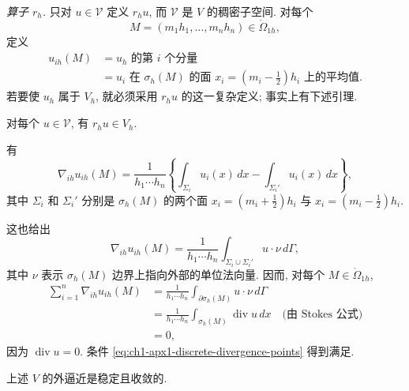 \emph{算子 $r_h$.} 只对 $u\in\mathcal V$ 定义 $r_hu$, 而 $\mathcal V$ 是 $V$ 的稠密子空间. 对每个
\[
M=(m_1h_1,\ldots,m_nh_n)\in\mathring\Omega_{1h},
\]
定义
\begin{equation}
\begin{aligned}
u_{ih}(M)&=u_h\text{ 的第 }i\text{ 个分量}\\
&=u_i\text{ 在 }\sigma_h(M)\text{ 的面 }
x_i=(m_i-\tfrac12)h_i\text{ 上的平均值}.
\end{aligned}
\label{eq:ch1-apx1-restriction-face-average}
\end{equation}
若要使 $u_h$ 属于 $V_h$, 就必须采用 $r_hu$ 的这一复杂定义; 事实上有下述引理.

\begin{Lemma}
\label{lem:ch1-apx1-restriction-in-vh}
对每个 $u\in\mathcal V$, 有 $r_hu\in V_h$.
\end{Lemma}

\begin{Proof}
有
\[
\nabla_{ih}u_{ih}(M)
=\frac1{h_1\cdots h_n}
\left\{\int_{\Sigma_i}u_i(x)\,dx-\int_{\Sigma_i'}u_i(x)\,dx\right\},
\]
其中 $\Sigma_i$ 和 $\Sigma_i'$ 分别是 $\sigma_h(M)$ 的两个面
$x_i=(m_i+\frac12)h_i$ 与 $x_i=(m_i-\frac12)h_i$.

这也给出
\[
\nabla_{ih}u_{ih}(M)
=\frac1{h_1\cdots h_n}\int_{\Sigma_i\cup\Sigma_i'}u\cdot\nu\,d\Gamma,
\]
其中 $\nu$ 表示 $\sigma_h(M)$ 边界上指向外部的单位法向量. 因而, 对每个 $M\in\mathring\Omega_{1h}$,
\[
\begin{aligned}
\sum_{i=1}^n\nabla_{ih}u_{ih}(M)
&=\frac1{h_1\cdots h_n}\int_{\partial\sigma_h(M)}u\cdot\nu\,d\Gamma\\
&=\frac1{h_1\cdots h_n}\int_{\sigma_h(M)}\operatorname{div}u\,dx
\quad\text{(由 Stokes 公式)}\\
&=0,
\end{aligned}
\]
因为 $\operatorname{div}u=0$. 条件 \eqref{eq:ch1-apx1-discrete-divergence-points} 得到满足.
\end{Proof}

\begin{Proposition}
\label{prop:ch1-apx1-stable-convergent}
上述 $V$ 的外逼近是稳定且收敛的.
\end{Proposition}

